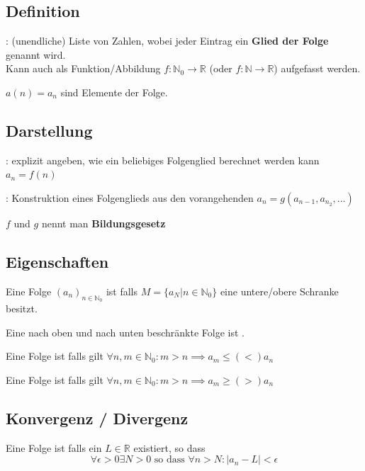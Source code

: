 \subsection{Definition}
: (unendliche) Liste von Zahlen, wobei jeder Eintrag ein \textbf{Glied der Folge} genannt wird.\\
Kann auch als Funktion/Abbildung $f:\mathbb{N}_0 \rightarrow \mathbb{R}$ (oder $f:\mathbb{N} \rightarrow \mathbb{R}$) aufgefasst werden.

 $a(n)=a_n$ sind Elemente der Folge.

\subsection{Darstellung}
: explizit angeben, wie ein beliebiges Folgenglied berechnet werden kann
$a_n = f(n)$

: Konstruktion eines Folgenglieds aus den vorangehenden
$a_n=g(a_{n-1}, a_{n_2},...)$

$f$ und $g$ nennt man \textbf{Bildungsgesetz}

\subsection{Eigenschaften}

Eine Folge $(a_n)_{n \in \mathbb{N}_0}$ ist  falls $M=\{a_N | n \in \mathbb{N}_0\}$ eine untere/obere Schranke besitzt.

Eine nach oben und nach unten beschränkte Folge ist .

Eine Folge ist  falls gilt $\forall n, m \in \mathbb{N}_0 : m > n \implies a_m \leq (<) a_n$

Eine Folge ist  falls gilt $\forall n, m \in \mathbb{N}_0 : m > n \implies a_m \geq (>) a_n$

\subsection{Konvergenz / Divergenz}

Eine Folge ist  falls ein $L \in \mathbb{R}$ existiert, so dass 
$$\forall \epsilon > 0 \exists N > 0 \text{ so dass }\forall n > N : |a_n -L| < \epsilon$$


